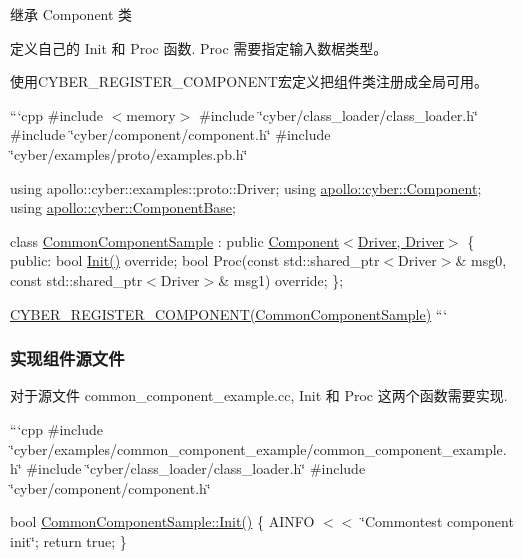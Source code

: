 \begin{DoxyItemize}
\item 继承 Component 类
\item 定义自己的 {\ttfamily Init} 和 {\ttfamily Proc} 函数. Proc 需要指定输入数椐类型。
\item 使用{\ttfamily C\-Y\-B\-E\-R\-\_\-\-R\-E\-G\-I\-S\-T\-E\-R\-\_\-\-C\-O\-M\-P\-O\-N\-E\-N\-T}宏定义把组件类注册成全局可用。
\end{DoxyItemize}

```cpp \#include $<$memory$>$ \#include \char`\"{}cyber/class\-\_\-loader/class\-\_\-loader.\-h\char`\"{} \#include \char`\"{}cyber/component/component.\-h\char`\"{} \#include \char`\"{}cyber/examples/proto/examples.\-pb.\-h\char`\"{}

using apollo\-::cyber\-::examples\-::proto\-::\-Driver; using \hyperlink{classapollo_1_1cyber_1_1Component}{apollo\-::cyber\-::\-Component}; using \hyperlink{classapollo_1_1cyber_1_1ComponentBase}{apollo\-::cyber\-::\-Component\-Base};

class \hyperlink{classCommonComponentSample}{Common\-Component\-Sample} \-: public \hyperlink{classapollo_1_1cyber_1_1Component}{Component$<$\-Driver, Driver$>$} \{ public\-: bool \hyperlink{namespaceapollo_1_1cyber_a2d055a81b338116634deaf8ac3367aca}{Init()} override; bool Proc(const std\-::shared\-\_\-ptr$<$\-Driver$>$\& msg0, const std\-::shared\-\_\-ptr$<$\-Driver$>$\& msg1) override; \};

\hyperlink{component_8h_a031103527dc7f59a627459d635de10f8}{C\-Y\-B\-E\-R\-\_\-\-R\-E\-G\-I\-S\-T\-E\-R\-\_\-\-C\-O\-M\-P\-O\-N\-E\-N\-T(\-Common\-Component\-Sample)} ```

\subsubsection*{实现组件源文件}

对于源文件 {\ttfamily common\-\_\-component\-\_\-example.\-cc}, {\ttfamily Init} 和 {\ttfamily Proc} 这两个函数需要实现.

```cpp \#include \char`\"{}cyber/examples/common\-\_\-component\-\_\-example/common\-\_\-component\-\_\-example.\-h\char`\"{} \#include \char`\"{}cyber/class\-\_\-loader/class\-\_\-loader.\-h\char`\"{} \#include \char`\"{}cyber/component/component.\-h\char`\"{}

bool \hyperlink{classCommonComponentSample_ae2a3f8c8ce4b9cfd9c6b357628bc84ee}{Common\-Component\-Sample\-::\-Init()} \{ A\-I\-N\-F\-O $<$$<$ \char`\"{}\-Commontest component init\char`\"{}; return true; \}


